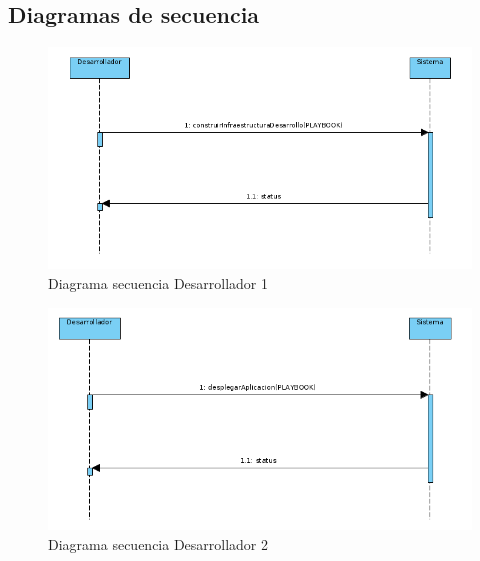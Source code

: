 	\subsection{Diagramas de secuencia}
		\begin{figure}[!hbt]
			\centering
			\includegraphics[scale=0.4]{imagenes/Analisis/diagrama_secuencia_desarrollador_1.png}
			\caption[Diagrama secuencia Desarrollador 1]{Diagrama secuencia Desarrollador 1 \cite{diagramasecuencia:online}} 
			\label{Diagrama secuencia_desarrollador_1}
		\end{figure}
		\clearpage
	
		\begin{figure}[!hbt]
			\centering
			\includegraphics[scale=0.4]{imagenes/Analisis/diagrama_secuencia_desarrollador_4.png}
			\caption[Diagrama secuencia Desarrollador 2]{Diagrama secuencia Desarrollador 2 \cite{diagramasecuencia:online}} 
			\label{Diagrama secuencia_desarrollador_2}
		\end{figure}

